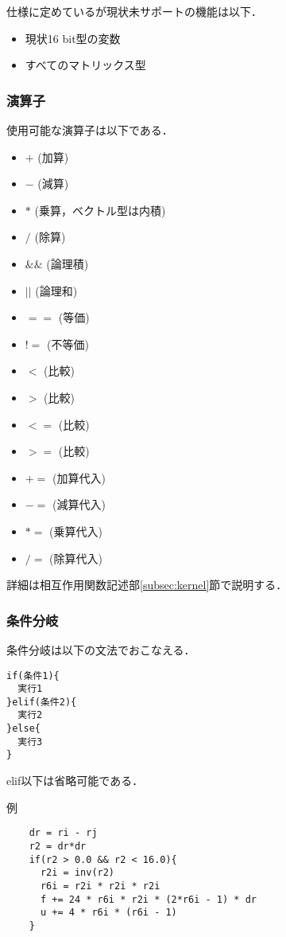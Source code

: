 \documentclass{article}
\begin{document}
 仕様に定めているが現状未サポートの機能は以下．
 \begin{itemize}
  \item 現状16 bit型の変数
  \item すべてのマトリックス型
 \end{itemize}

 \subsubsection{演算子}
 使用可能な演算子は以下である．
  \begin{itemize}
   \item $+$ (加算)
   \item $-$ (減算)
   \item $*$ (乗算，ベクトル型は内積)
   \item $/$ (除算)
   \item $\&\&$ (論理積)
   \item $||$ (論理和)
   \item $==$ (等価)
   \item $!=$ (不等価)
   \item $<$ (比較)
   \item $>$ (比較)
   \item $<=$ (比較)
   \item $>=$ (比較)
   \item $+=$ (加算代入)
   \item $-=$ (減算代入)
   \item $*=$ (乗算代入)
   \item $/=$ (除算代入)
  \end{itemize}
 詳細は相互作用関数記述部\ref{subsec:kernel}節で説明する．

 \subsubsection{条件分岐}
 条件分岐は以下の文法でおこなえる．
\begin{verbatim}
if(条件1){
  実行1
}elif(条件2){
  実行2
}else{
  実行3
}
\end{verbatim}
elif以下は省略可能である．

例
\begin{verbatim}
	dr = ri - rj
	r2 = dr*dr
	if(r2 > 0.0 && r2 < 16.0){
	  r2i = inv(r2)
	  r6i = r2i * r2i * r2i
	  f += 24 * r6i * r2i * (2*r6i - 1) * dr
	  u += 4 * r6i * (r6i - 1)
	}
\end{verbatim}
\end{document}
